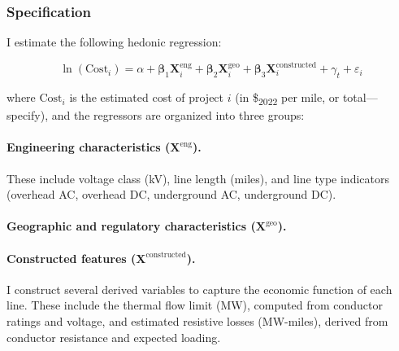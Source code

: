 \documentclass[12pt]{article}
\begin{document}

\subsubsection{Specification}

I estimate the following hedonic regression:

\begin{equation}
\ln(\text{Cost}_i) = \alpha + \boldsymbol{\beta}_1 \mathbf{X}_i^{\text{eng}} + \boldsymbol{\beta}_2 \mathbf{X}_i^{\text{geo}} + \boldsymbol{\beta}_3 \mathbf{X}_i^{\text{constructed}} + \gamma_t + \varepsilon_i
\label{eq:hedonic}
\end{equation}

\noindent where $\text{Cost}_i$ is the estimated cost of project $i$ (in \$\textsubscript{2022} per mile, or total---specify), and the regressors are organized into three groups:

\paragraph{Engineering characteristics ($\mathbf{X}^{\text{eng}}$).} These include voltage class (kV), line length (miles), and line type indicators (overhead AC, overhead DC, underground AC, underground DC). %

\paragraph{Geographic and regulatory characteristics ($\mathbf{X}^{\text{geo}}$).} %

\paragraph{Constructed features ($\mathbf{X}^{\text{constructed}}$).} I construct several derived variables to capture the economic function of each line. These include the thermal flow limit (MW), computed from conductor ratings and voltage, and estimated resistive losses (MW-miles), derived from conductor resistance and expected loading. %
\end{document}
